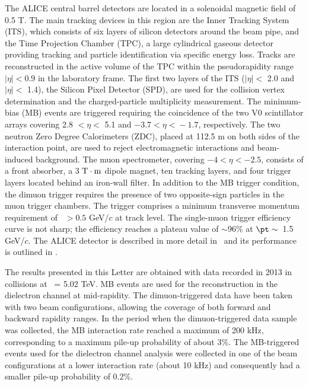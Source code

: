 
The ALICE central barrel detectors are located in a solenoidal magnetic field of 0.5 T. The main tracking devices in this region are the Inner Tracking System (ITS), which consists of six layers of silicon detectors around the beam pipe, and the Time Projection Chamber (TPC), a large cylindrical gaseous detector providing tracking and particle identification via specific energy loss. Tracks are reconstructed in the active volume of the TPC within the pseudorapidity range $|\eta|<0.9$ in the laboratory frame.  The first two layers of the ITS ($|\eta| < $ 2.0 and $|\eta| < $ 1.4), the Silicon Pixel Detector (SPD), are used for the collision vertex determination and the charged-particle multiplicity measurement. The minimum-bias (MB) events are triggered requiring the coincidence of the two V0 scintillator arrays covering 2.8 $< \eta <$ 5.1 and $-3.7 < \!\eta \!< \!-1.7$, respectively. The two neutron Zero Degree Calorimeters (ZDC), placed at 112.5 m on both sides of the interaction point, are used to reject electromagnetic interactions and beam-induced background. 
The muon spectrometer, covering $-4 < \eta < -2.5$, consists of a front absorber, a 3 $\rm{T} \cdot \rm{m}$ dipole magnet, ten tracking layers, and four trigger layers located behind an iron-wall filter. In addition to the MB trigger condition, the dimuon trigger requires the presence of two opposite-sign particles in the muon trigger chambers.  The trigger comprises a minimum transverse momentum requirement of \pt~$> 0.5$ GeV/$c$ at track level.  The single-muon trigger efficiency curve is not sharp; the efficiency reaches a plateau value of $\sim 96\%$ at $\pt \sim$~1.5 GeV/$c$. The ALICE detector is described in more detail in~\cite{Abelev:2008aa} and its performance is outlined in \cite{Abelev:2014ffa}. 

The results presented in this Letter are obtained with data recorded in 2013 in \ppb collisions at \snn ~= 5.02 TeV. MB events are used for the \jpsi reconstruction in the dielectron channel at mid-rapidity. The dimuon-triggered data have been taken with two beam configurations, allowing the coverage of both forward and backward rapidity ranges.
In the period when the dimuon-triggered data sample was collected, the MB interaction rate reached a maximum of 200 kHz, corresponding to a maximum pile-up probability of about 3\%. The MB-triggered events used for the dielectron channel analysis were collected in one of the beam configurations at a lower interaction rate (about 10 kHz) and consequently had a smaller pile-up probability of 0.2\%.

